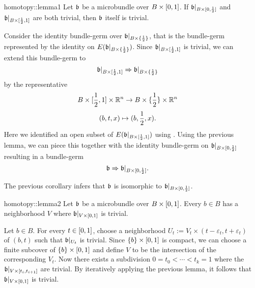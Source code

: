 \begin{scope}
\newcommand{\A}[1][] {
    A_\alpha#1
}

\newcommand{\bbleft} {
    \bb\restr{B \times{} [0, \half]}
}
\newcommand{\bbright} {
    \bb\restr{B \times{} [\half, 1]}
}
\newcommand{\bbhalf} {
    \bb\restr{B \times{} \{ \half \}}
}

\begin{mylemma}{homotopy::lemma1}
    Let $\mathfrak{b}$ be a microbundle over $B \times [0, 1]$. If $\bbleft$ and $\bbright$ are both trivial,
    then $\mathfrak{b}$ itself is trivial.
\end{mylemma}
\begin{myproof}
    Consider the identity bundle-germ over $\bbhalf$, that is the bundle-germ represented by the identity on $E(\bbhalf)$.
    Since $\bbright$ is trivial, we can extend this bundle-germ to 
    \[ \bbright \double \bbhalf \]
    by the representative
    \[ B \times [\frac{1}{2}, 1] \times \mathbb{R}^n \to B \times \{\frac{1}{2}\} \times \mathbb{R}^n \]
    \[ (b, t, x) \mapsto (b, \frac{1}{2}, x). \]
    Here we identified an open subset of $E(\mathfrak{b}\vert_{B \times [\frac{1}{2}, 1]})$ using .
    Using the previous lemma, we can piece this together with the identity bundle-germ on $\bbleft$ resulting in a bundle-germ
    \[ \bb \double \bbleft. \]

    The previous corollary infers that $\mathfrak{b}$ is isomorphic to $\bbleft$.
\end{myproof}

\begin{mylemma}{homotopy::lemma2}
    Let $\mathfrak{b}$ be a microbundle over $B \times [0, 1]$.
    Every $b \in B$ has a neighborhood $V$ where $\mathfrak{b}\vert_{V \times [0, 1]}$ is trivial.
\end{mylemma}
\begin{myproof}
    Let $b \in B$.
    For every $t \in [0, 1]$, choose a neighborhood $U_t := V_t \times (t - \varepsilon_t, t + \varepsilon_t)$ of $(b, t)$ such that $\mathfrak{b}\vert_{U_t}$ is trivial.
    Since $\{b\} \times [0, 1]$ is compact, we can choose a finite subcover of $\{b\} \times [0, 1]$ and define $V$ to be the intersection of the corresponding $V_t$.
    Now there exists a subdivision $0 = t_0 < \cdots < t_k = 1$ where the $\mathfrak{b}\vert_{V \times [t_{i}, t_{i + 1}]}$ are trivial.
    By iteratively applying the previous lemma, it follows that $\mathfrak{b}\vert_{V \times [0, 1]}$ is trivial.
\end{myproof}


\end{scope}
